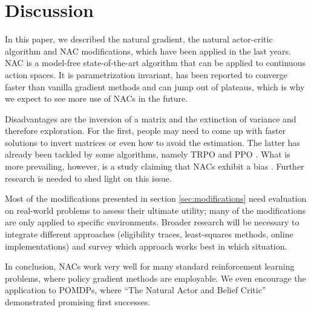 
\section{Discussion}
\label{sec:discussion}

In this paper, we described the natural gradient, the natural actor-critic algorithm and NAC modifications, which have been applied in the last years. NAC is a model-free state-of-the-art algorithm that can be applied to continuous action spaces. It is parametrization invariant, has been reported to converge faster than vanilla gradient methods and can jump out of plateaus, which is why we expect to see more use of NACs in the future. 

Disadvantages are the inversion of a matrix and the extinction of variance and therefore exploration. For the first, people may need to come up with faster solutions to invert matrices or even how to avoid the estimation. The latter has already been tackled by some algorithms, namely TRPO \citep{schulman2015trust} and PPO \citep{schulman2017proximal}. What is more prevailing, however, is a study claiming that NACs exhibit a bias \cite{thomas2014bias}. Further research is needed to shed light on this issue.

Most of the modifications presented in section \ref{sec:modifications} need evaluation on real-world problems to assess their ultimate utility; many of the modifications are only applied to specific environments. Broader research will be necessary to integrate different approaches (eligibility traces, least-squares methods, online implementations) and survey which approach works best in which situation.

In conclusion, NACs work very well for many standard reinforcement learning problems, where policy gradient methods are employable. We even encourage the application to POMDPs, where ``The Natural Actor and Belief Critic'' \cite{jurvcivcek2011natural} demonstrated promising first successes.

\newpage



